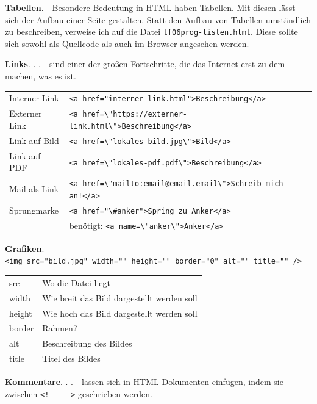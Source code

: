 {\bf Tabellen}.\ \ Besondere Bedeutung in HTML haben Tabellen. Mit diesen lässt sich der Aufbau einer Seite gestalten. Statt den Aufbau von Tabellen umständlich zu beschreiben, verweise ich auf die Datei \texttt{lf06prog-listen.html}. Diese sollte sich sowohl als Quellcode als auch im Browser angesehen werden.\newline

{\bf Links}. . .\ \ sind einer der großen Fortschritte, die das Internet erst zu dem machen, was es ist.
\begin{tabular}{lll}
Interner Link & \verb+<a href="interner-link.html">Beschreibung</a>+ &\\
Externer Link & \verb+<a href=\"https://externer-link.html\">Beschreibung</a>+ &\\
Link auf Bild & \verb+<a href=\"lokales-bild.jpg\">Bild</a>+ &\\
Link auf PDF & \verb+<a href=\"lokales-pdf.pdf\">Beschreibung</a>+ &\\
Mail als Link & \verb+<a href=\"mailto:email@email.email\">Schreib mich an!</a>+ &\\
Sprungmarke & \verb+<a href="\#anker">Spring zu Anker</a>+ &\\
& benötigt: \verb+<a name=\"anker\">Anker</a>+ &\\
\end{tabular}\newline

{\bf Grafiken}.\\
\verb+<img src="bild.jpg" width="" height="" border="0" alt="" title="" />+\\
\begin{tabular}{ll}
src & Wo die Datei liegt\\
width & Wie breit das Bild dargestellt werden soll\\
height & Wie hoch das Bild dargestellt werden soll\\
border & Rahmen?\\
alt & Beschreibung des Bildes\\
title & Titel des Bildes\\
\end{tabular}\newline

{\bf Kommentare}. . .\ \ lassen sich in HTML-Dokumenten einfügen, indem sie zwischen \verb+<!-- -->+ geschrieben werden.


